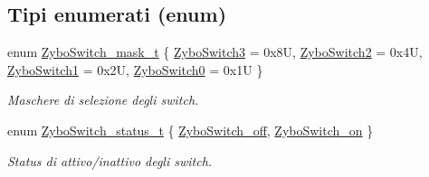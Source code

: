 \subsection*{Tipi enumerati (enum)}
\begin{DoxyCompactItemize}
\item 
enum \hyperlink{group___switch_ga2e0602a824354f25c395f938caba3703}{Zybo\+Switch\+\_\+mask\+\_\+t} \{ \hyperlink{group___switch_gga2e0602a824354f25c395f938caba3703a73ccea5ad8c919fe962e9a67a3733ee3}{Zybo\+Switch3} = 0x8\+U, 
\hyperlink{group___switch_gga2e0602a824354f25c395f938caba3703aac2f5ebb28eb3bd93fcdf8019b6a3e9e}{Zybo\+Switch2} = 0x4\+U, 
\hyperlink{group___switch_gga2e0602a824354f25c395f938caba3703a694a25c87b1ec597d2a6032bf5d34b0f}{Zybo\+Switch1} = 0x2\+U, 
\hyperlink{group___switch_gga2e0602a824354f25c395f938caba3703a84350e8b6e7a7e2cabf22fc7a1a5c651}{Zybo\+Switch0} = 0x1\+U
 \}
\begin{DoxyCompactList}\small\item\em Maschere di selezione degli switch. \end{DoxyCompactList}\item 
enum \hyperlink{group___switch_ga4ba6b49b2f47ebb464aefcea7e23e04a}{Zybo\+Switch\+\_\+status\+\_\+t} \{ \hyperlink{group___switch_gga4ba6b49b2f47ebb464aefcea7e23e04aa1d686faf83e8606e68eec0b7e525a755}{Zybo\+Switch\+\_\+off}, 
\hyperlink{group___switch_gga4ba6b49b2f47ebb464aefcea7e23e04aafba009508b8822de867af69034e3e4f8}{Zybo\+Switch\+\_\+on}
 \}
\begin{DoxyCompactList}\small\item\em Status di attivo/inattivo degli switch. \end{DoxyCompactList}\end{DoxyCompactItemize}
